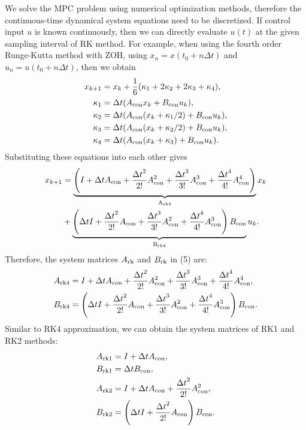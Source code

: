 We solve the MPC problem using numerical optimization methods, therefore the continuous-time dynamical system equations need to be discretized. If control input $u$ is known continuously, then we can directly evaluate $u(t)$ at the given sampling interval of RK method. For example, when using the fourth order Runge-Kutta method with ZOH, using $x_n = x(t_0+n\Delta t)$ and $u_n = u(t_0+n\Delta t)$, then we obtain
\begin{equation}
	\begin{split}
		x_{k+1} &= x_k + \frac{1}{6}(\kappa_1 + 2\kappa_2 +2\kappa_3 + \kappa_4),\\
		\kappa_1 &= \Delta t(A_{\rm{con}}x_k+B_{\rm{con}}u_k),\\
		\kappa_2 &= \Delta t(A_{\rm{con}}(x_k+\kappa_1/2)+B_{\rm{con}}u_k),\\
		\kappa_3 &= \Delta t(A_{\rm{con}}(x_k+\kappa_2/2)+B_{\rm{con}}u_k),\\
		\kappa_4 &= \Delta t(A_{\rm{con}}(x_k+\kappa_3)+B_{\rm{con}}u_k).\\
	\end{split}
\end{equation}
Substituting these equations into each other gives
\begin{equation}
	\begin{split}
	    x_{k+1} &= \underbrace{\left(I + \Delta t A_{\rm{con}} + \frac{{\Delta t}^2}{2!}A_{\rm{con}}^2 + \frac{{\Delta t}^3}{3!}A_{\rm{con}}^3 + \frac{{\Delta t}^4}{4!}A_{\rm{con}}^4\right)}_{\rm{A_{rk4}}}x_k\\
	    &+ \underbrace{\left(\Delta t I  + \frac{{\Delta t}^2}{2!}A_{\rm{con}} + \frac{{\Delta t}^3}{3!}A_{\rm{con}}^2 + \frac{{\Delta t}^4}{4!}A_{\rm{con}}^3\right)B_{\rm{con}}}_{\rm{B_{rk4}}}u_k.
	\end{split}
\end{equation}
Therefore, the system matrices $A_{\rm{rk}}$ and $B_{\rm{rk}}$ in (5) are:
\begin{equation}
	\begin{split}
		A_{\rm{rk4}} &= I + \Delta t A_{\rm{con}} + \frac{{\Delta t}^2}{2!}A_{\rm{con}}^2 + \frac{{\Delta t}^3}{3!}A_{\rm{con}}^3 + \frac{{\Delta t}^4}{4!}A_{\rm{con}}^4,\\
		B_{\rm{rk4}} &= \left(\Delta t I  + \frac{{\Delta t}^2}{2!}A_{\rm{con}} + \frac{{\Delta t}^3}{3!}A_{\rm{con}}^2 + \frac{{\Delta t}^4}{4!}A_{\rm{con}}^3\right)B_{\rm{con}}.
	\end{split}
\end{equation}
Similar to RK4 approximation, we can obtain the system matrices of RK1 and RK2 methods:
\begin{equation}
	\begin{split}
		A_{\rm{rk1}} &= I + \Delta t A_{\rm{con}},\\
		B_{\rm{rk1}} &= \Delta tB_{\rm{con}},\\
		A_{\rm{rk2}} &= I + \Delta t A_{\rm{con}} + \frac{{\Delta t}^2}{2!}A_{\rm{con}}^2,\\
		B_{\rm{rk2}} &= \left(\Delta t I  + \frac{{\Delta t}^2}{2!}A_{\rm{con}}\right)B_{\rm{con}}.
	\end{split}
\end{equation}

